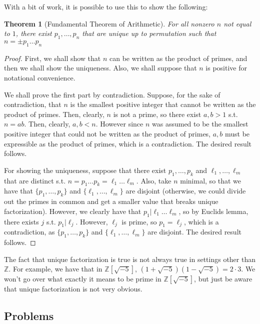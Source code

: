 \documentclass{article}
\theoremstyle{plain}
\newtheorem{theorem}{Theorem}
\numberwithin{equation}{section}
\begin{document}
With a bit of work, it is possible to use this to show the following:

\begin{theorem}[Fundamental Theorem of Arithmetic]
For all nonzero $n$ not equal to $1$, there exist $p_1, \dots, p_n$ that are unique up to permutation such that $n = \pm p_1\dots p_n$
\end{theorem}

\begin{proof}
First, we shall show that $n$ can be written as the product of primes, and then we shall show the uniqueness. Also, we shall suppose
that $n$ is positive for notational convenience.

We shall prove the first part by contradiction. 
Suppose, for the sake of contradiction, that $n$ is the smallest positive integer that cannot be written as the product
of primes. Then, clearly, $n$ is not a prime, so there exist $a, b > 1$ s.t. $n = ab$. Then, clearly, $a,b < n$. However since 
$n$ was assumed to be the smallest positive integer that could not be written as the product of primes, $a, b$ must be expressible 
as the product of primes, which is a contradiction. The desired result follows.

For showing the uniqueness, suppose that there exist $p_1, \dots, p_k$ and $\ell_1, \dots, \ell_m$ that are distinct s.t. 
$n = p_1\dots p_k = \ell_1\dots\ell_m.$ Also, take $n$ minimal, so 
that we have that $\{p_1, \dots, p_k\}$ and $\{\ell_1, \dots, \ell_m\}$ 
are disjoint (otherwise, we could divide out the primes in common and get a smaller value that breaks unique factorization). 
However, we clearly have that $p_1 | \ell_1\dots \ell_m$, so by Euclids lemma, there exists $j$ s.t. $p_1|\ell_j.$ 
However, $\ell_j$ is prime, so $p_1 = \ell_j$, which is a contradiction, as $\{p_1, \dots, p_k\}$ and $\{\ell_1, \dots, \ell_m\}$
are disjoint. The desired result follows.
\end{proof}

The fact that unique factorization is true is not always true in settings other than $\mathbb{Z}$. For example, we have that in 
$\mathbb{Z}[\sqrt{-5}]$, $(1 + \sqrt{-5})(1 - \sqrt{-5}) = 2\cdot 3$. We won't go over what exactly it means to be
prime in $\mathbb{Z}[\sqrt{-5}]$, but just be aware that unique factorization is not very obvious.

\subsection*{Problems}
\end{document}
